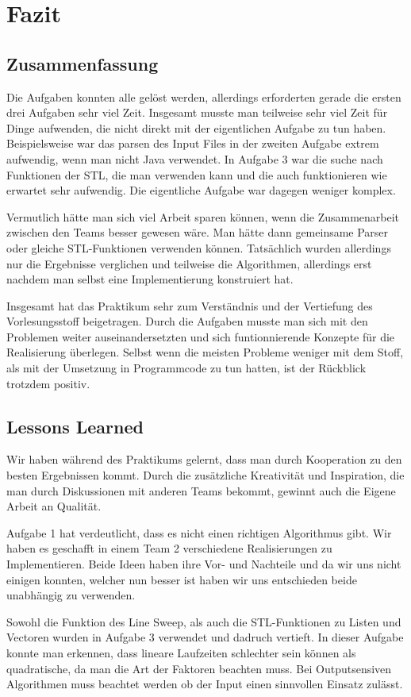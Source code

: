 \section{Fazit}
\label{sec:Fazit}

\subsection{Zusammenfassung}
Die Aufgaben konnten alle gelöst werden, allerdings erforderten gerade die ersten drei Aufgaben sehr viel Zeit. Insgesamt musste man teilweise sehr viel Zeit für Dinge aufwenden, die nicht direkt mit der eigentlichen Aufgabe zu tun haben. Beispielsweise war das parsen des Input Files in der zweiten Aufgabe extrem aufwendig, wenn man nicht Java verwendet. In Aufgabe 3 war die suche nach Funktionen der STL, die man verwenden kann und die auch funktionieren wie erwartet sehr aufwendig. Die eigentliche Aufgabe war dagegen weniger komplex.

Vermutlich hätte man sich viel Arbeit sparen können, wenn die Zusammenarbeit zwischen den Teams besser gewesen wäre. Man hätte dann gemeinsame Parser oder gleiche STL-Funktionen verwenden können. Tatsächlich wurden allerdings nur die Ergebnisse verglichen und teilweise die Algorithmen, allerdings erst nachdem man selbst eine Implementierung konstruiert hat.

Insgesamt hat das Praktikum sehr zum Verständnis und der Vertiefung des Vorlesungsstoff beigetragen. Durch die Aufgaben musste man sich mit den Problemen weiter auseinandersetzten und sich funtionnierende Konzepte für die Realisierung überlegen. Selbst wenn die meisten Probleme weniger mit dem Stoff, als mit der Umsetzung in Programmcode zu tun hatten, ist der Rückblick trotzdem positiv.

\subsection{Lessons Learned}
Wir haben während des Praktikums gelernt, dass man durch Kooperation zu den besten Ergebnissen kommt. Durch die zusätzliche Kreativität und Inspiration, die man durch Diskussionen mit anderen Teams bekommt, gewinnt auch die Eigene Arbeit an Qualität.

Aufgabe 1 hat verdeutlicht, dass es nicht einen richtigen Algorithmus gibt. Wir haben es geschafft in einem Team 2 verschiedene Realisierungen zu Implementieren. Beide Ideen haben ihre Vor- und Nachteile und da wir uns nicht einigen konnten, welcher nun besser ist haben wir uns entschieden beide unabhängig zu verwenden.

Sowohl die Funktion des Line Sweep, als auch die STL-Funktionen zu Listen und Vectoren wurden in Aufgabe 3 verwendet und dadruch vertieft. In dieser Aufgabe konnte man erkennen, dass lineare Laufzeiten schlechter sein können als quadratische, da man die Art der Faktoren beachten muss. Bei Outputsensiven Algorithmen muss beachtet werden ob der Input einen sinnvollen Einsatz zulässt.